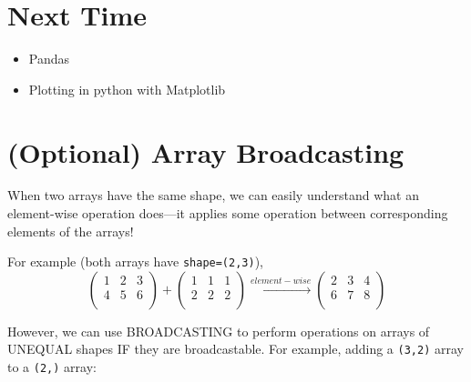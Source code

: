 \documentclass[12pt]{article}
\numberwithin{equation}{section}
\begin{document}
\section{Next Time}
\begin{itemize}
    \item Pandas
    \item Plotting in python with Matplotlib
\end{itemize}

\appendix
\section{(Optional) Array Broadcasting}
When two arrays have the same shape, we can easily understand what an element-wise operation does---it applies some operation between corresponding elements of the arrays!

For example (both arrays have \verb|shape=(2,3)|),
\begin{equation*}
    \begin{pmatrix}
        1 & 2 & 3\\
        4 & 5 & 6\\
    \end{pmatrix}
    +
    \begin{pmatrix}
        1 & 1 & 1\\
        2 & 2 & 2\\
    \end{pmatrix}
    \xrightarrow{element-wise }
    \begin{pmatrix}
        2 & 3 & 4\\
        6 & 7 & 8\\
    \end{pmatrix}
\end{equation*}

However, we can use BROADCASTING to perform operations on arrays of UNEQUAL shapes IF they are broadcastable. For example, adding a \verb|(3,2)| array to a \verb|(2,)| array:
\end{document}
